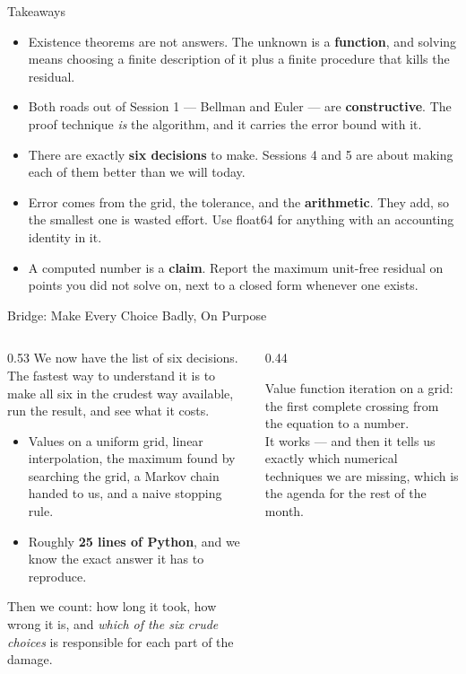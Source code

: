 \begin{frame}{Takeaways}
\begin{takeawaybox}
\begin{itemize}\small
  \item Existence theorems are not answers. The unknown is a \textbf{function}, and solving means choosing a finite description of it plus a finite procedure that kills the residual.
  \item Both roads out of Session 1 --- Bellman and Euler --- are \textbf{constructive}. The proof technique \emph{is} the algorithm, and it carries the error bound with it.
  \item There are exactly \textbf{six decisions} to make. Sessions 4 and 5 are about making each of them better than we will today.
  \item Error comes from the grid, the tolerance, and the \textbf{arithmetic}. They add, so the smallest one is wasted effort. Use float64 for anything with an accounting identity in it.
  \item A computed number is a \textbf{claim}. Report the maximum unit-free residual on points you did not solve on, next to a closed form whenever one exists.
\end{itemize}
\end{takeawaybox}
\end{frame}

\begin{frame}{Bridge: Make Every Choice Badly, On Purpose}
\begin{columns}[T]
\begin{column}{0.53\textwidth}
\small
We now have the list of six decisions. The fastest way to understand it is to make all six in the crudest way available, run the result, and see what it costs.
\medskip
\begin{itemize}\footnotesize
  \item Values on a uniform grid, linear interpolation, the maximum found by searching the grid, a Markov chain handed to us, and a naive stopping rule.
  \item Roughly \textbf{25 lines of Python}, and we know the exact answer it has to reproduce.
\end{itemize}
\medskip
Then we count: how long it took, how wrong it is, and \emph{which of the six crude choices} is responsible for each part of the damage.
\end{column}
\begin{column}{0.44\textwidth}
\begin{conceptbox}[title=\textbf{Next (3.A2)}]\small
Value function iteration on a grid: the first complete crossing from the equation to a number.\\[1mm]
It works --- and then it tells us exactly which numerical techniques we are missing, which is the agenda for the rest of the month.
\end{conceptbox}
\end{column}
\end{columns}
\end{frame}


